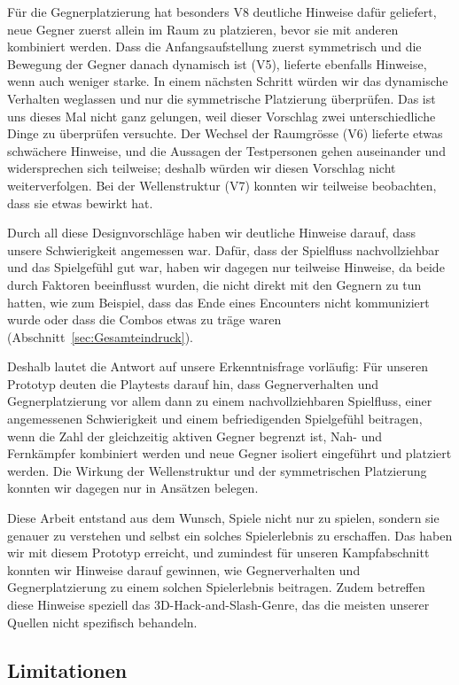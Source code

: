 \documentclass[../Main.tex]{subfiles}
\begin{document}
Für die Gegnerplatzierung hat besonders V8 deutliche Hinweise dafür geliefert, neue Gegner zuerst allein im Raum zu platzieren, bevor sie mit anderen kombiniert werden. Dass die Anfangsaufstellung zuerst symmetrisch und die Bewegung der Gegner danach dynamisch ist (V5), lieferte ebenfalls Hinweise, wenn auch weniger starke. In einem nächsten Schritt würden wir das dynamische Verhalten weglassen und nur die symmetrische Platzierung überprüfen. Das ist uns dieses Mal nicht ganz gelungen, weil dieser Vorschlag zwei unterschiedliche Dinge zu überprüfen versuchte. Der Wechsel der Raumgrösse (V6) lieferte etwas schwächere Hinweise, und die Aussagen der Testpersonen gehen auseinander und widersprechen sich teilweise; deshalb würden wir diesen Vorschlag nicht weiterverfolgen. Bei der Wellenstruktur (V7) konnten wir teilweise beobachten, dass sie etwas bewirkt hat.

Durch all diese Designvorschläge haben wir deutliche Hinweise darauf, dass unsere Schwierigkeit angemessen war. Dafür, dass der Spielfluss nachvollziehbar und das Spielgefühl gut war, haben wir dagegen nur teilweise Hinweise, da beide durch Faktoren beeinflusst wurden, die nicht direkt mit den Gegnern zu tun hatten, wie zum Beispiel, dass das Ende eines Encounters nicht kommuniziert wurde oder dass die Combos etwas zu träge waren (Abschnitt~\ref{sec:Gesamteindruck}).

Deshalb lautet die Antwort auf unsere Erkenntnisfrage vorläufig: Für unseren Prototyp deuten die Playtests darauf hin, dass Gegnerverhalten und Gegnerplatzierung vor allem dann zu einem nachvollziehbaren Spielfluss, einer angemessenen Schwierigkeit und einem befriedigenden Spielgefühl beitragen, wenn die Zahl der gleichzeitig aktiven Gegner begrenzt ist, Nah- und Fernkämpfer kombiniert werden und neue Gegner isoliert eingeführt und platziert werden. Die Wirkung der Wellenstruktur und der symmetrischen Platzierung konnten wir dagegen nur in Ansätzen belegen.

Diese Arbeit entstand aus dem Wunsch, Spiele nicht nur zu spielen, sondern sie genauer zu verstehen und selbst ein solches Spielerlebnis zu erschaffen. Das haben wir mit diesem Prototyp erreicht, und zumindest für unseren Kampfabschnitt konnten wir Hinweise darauf gewinnen, wie Gegnerverhalten und Gegnerplatzierung zu einem solchen Spielerlebnis beitragen. Zudem betreffen diese Hinweise speziell das 3D-Hack-and-Slash-Genre, das die meisten unserer Quellen nicht spezifisch behandeln.

\subsection{Limitationen} \label{sec:Limitationen}
\end{document}
